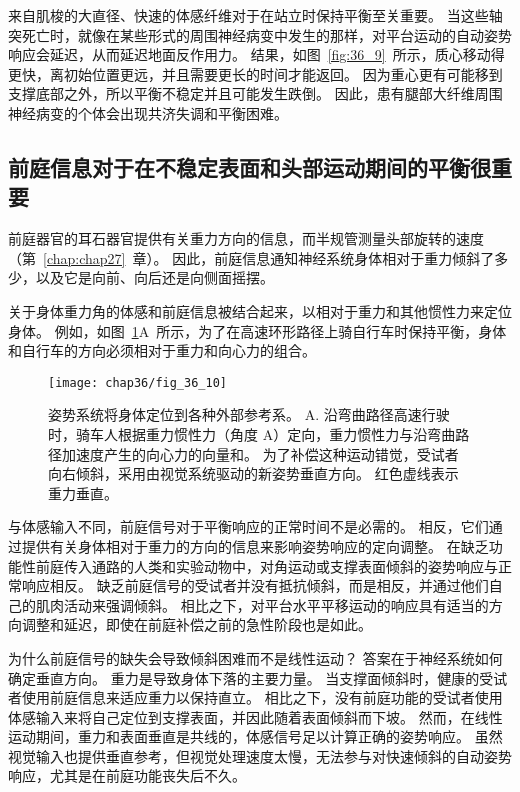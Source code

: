 来自肌梭的大直径、快速的体感纤维对于在站立时保持平衡至关重要。
当这些轴突死亡时，就像在某些形式的周围神经病变中发生的那样，对平台运动的自动姿势响应会延迟，从而延迟地面反作用力。
结果，如图~\ref{fig:36_9}~所示，质心移动得更快，离初始位置更远，并且需要更长的时间才能返回。
因为重心更有可能移到支撑底部之外，所以平衡不稳定并且可能发生跌倒。
因此，患有腿部大纤维周围神经病变的个体会出现共济失调和平衡困难。



\subsection{前庭信息对于在不稳定表面和头部运动期间的平衡很重要}

前庭器官的耳石器官提供有关重力方向的信息，而半规管测量头部旋转的速度（第~\ref{chap:chap27}~章）。
因此，前庭信息通知神经系统身体相对于重力倾斜了多少，以及它是向前、向后还是向侧面摇摆。


关于身体重力角的体感和前庭信息被结合起来，以相对于重力和其他惯性力来定位身体。
例如，如图~\ref{fig:36_10}A~所示，为了在高速环形路径上骑自行车时保持平衡，身体和自行车的方向必须相对于重力和向心力的组合。


\begin{figure}[htbp]
	\centering
	\texttt{[image: chap36/fig\_36\_10]}
	\caption{姿势系统将身体定位到各种外部参考系。
		A. 沿弯曲路径高速行驶时，骑车人根据重力惯性力（角度 A）定向，重力惯性力与沿弯曲路径加速度产生的向心力的向量和。
		为了补偿这种运动错觉，受试者向右倾斜，采用由视觉系统驱动的新姿势垂直方向。
		红色虚线表示重力垂直。 }
	\label{fig:36_10}
\end{figure}


与体感输入不同，前庭信号对于平衡响应的正常时间不是必需的。
相反，它们通过提供有关身体相对于重力的方向的信息来影响姿势响应的定向调整。
在缺乏功能性前庭传入通路的人类和实验动物中，对角运动或支撑表面倾斜的姿势响应与正常响应相反。
缺乏前庭信号的受试者并没有抵抗倾斜，而是相反，并通过他们自己的肌肉活动来强调倾斜。
相比之下，对平台水平平移运动的响应具有适当的方向调整和延迟，即使在前庭补偿之前的急性阶段也是如此。


为什么前庭信号的缺失会导致倾斜困难而不是线性运动？
答案在于神经系统如何确定垂直方向。
重力是导致身体下落的主要力量。
当支撑面倾斜时，健康的受试者使用前庭信息来适应重力以保持直立。
相比之下，没有前庭功能的受试者使用体感输入来将自己定位到支撑表面，并因此随着表面倾斜而下坡。
然而，在线性运动期间，重力和表面垂直是共线的，体感信号足以计算正确的姿势响应。
虽然视觉输入也提供垂直参考，但视觉处理速度太慢，无法参与对快速倾斜的自动姿势响应，尤其是在前庭功能丧失后不久。


